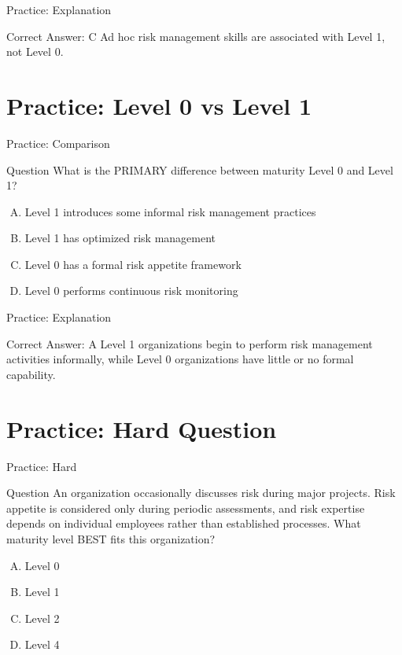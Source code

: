 \documentclass{beamer}
\begin{document}
	\begin{frame}{Practice: Explanation}
		\begin{block}{Correct Answer: C}
			Ad hoc risk management skills are associated with Level 1, not Level 0.
		\end{block}
	\end{frame}
	

	\section{Practice: Level 0 vs Level 1}
	
	\begin{frame}{Practice: Comparison}
		\begin{block}{Question}
			What is the PRIMARY difference between maturity Level 0 and Level 1?
		\end{block}
		\begin{enumerate}[(A)]
			\item Level 1 introduces some informal risk management practices
			\item Level 1 has optimized risk management
			\item Level 0 has a formal risk appetite framework
			\item Level 0 performs continuous risk monitoring
		\end{enumerate}
	\end{frame}
	
	\begin{frame}{Practice: Explanation}
		\begin{block}{Correct Answer: A}
			Level 1 organizations begin to perform risk management activities informally, while Level 0 organizations have little or no formal capability.
		\end{block}
	\end{frame}
	

	\section{Practice: Hard Question}
	
	\begin{frame}{Practice: Hard}
		\begin{block}{Question}
			An organization occasionally discusses risk during major projects. Risk appetite is considered only during periodic assessments, and risk expertise depends on individual employees rather than established processes. What maturity level BEST fits this organization?
		\end{block}
		\begin{enumerate}[(A)]
			\item Level 0
			\item Level 1
			\item Level 2
			\item Level 4
		\end{enumerate}
	\end{frame}
	
\end{document}
